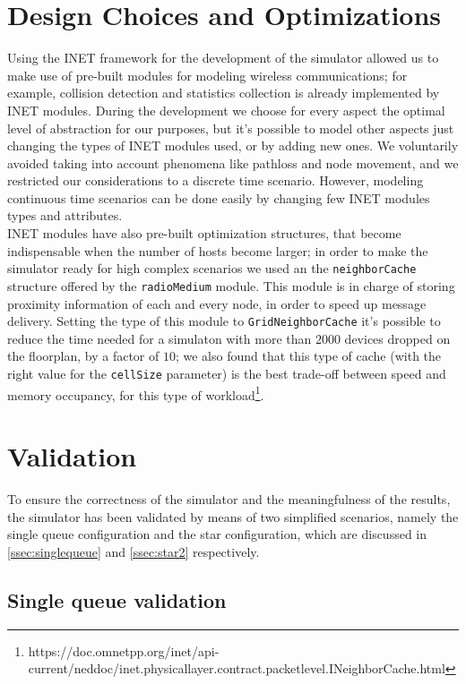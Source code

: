\section{Design Choices and Optimizations}
Using the INET framework for the development of the simulator allowed us to
make use of pre-built modules for modeling wireless communications; for example,
collision detection and statistics collection is already implemented by INET
modules. During the development we choose for every aspect the optimal level of
abstraction for our purposes, but it's possible to model other aspects just 
changing the types of INET modules used, or by adding new ones. We voluntarily
avoided taking into account phenomena like pathloss and node movement, and we 
restricted our considerations to a discrete time scenario. However, modeling
continuous time scenarios can be done easily by changing few INET modules types
and attributes.\\
INET modules have also pre-built optimization structures, that become
indispensable when the number of hosts become larger; in order to make the
simulator ready for high complex scenarios we used an the \texttt{neighborCache}
structure offered by the \texttt{radioMedium} module. This module is in charge
of storing proximity information of each and every node, in order to speed up
message delivery. Setting the type of this module to \texttt{GridNeighborCache}
it's possible to reduce the time needed for a simulaton with more than
$2000$ devices dropped on the floorplan, by a factor of $10$; we also found that
this type of cache (with the right value for the \texttt{cellSize} parameter) is
the best trade-off between speed and memory occupancy, for this type of
workload\footnote{https://doc.omnetpp.org/inet/api-current/neddoc/inet.physicallayer.contract.packetlevel.INeighborCache.html}.  

\section{Validation}
To ensure the correctness of the simulator and the meaningfulness of the results, the simulator has been validated by means of two simplified scenarios, namely the single queue configuration and the star configuration, which are discussed in \ref{ssec:singlequeue} and \ref{ssec:star2} respectively.

\subsection{Single queue validation}

